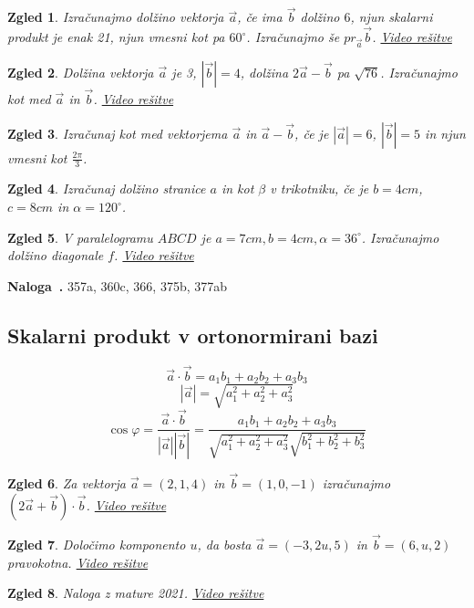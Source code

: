 \documentclass{article}
\newcounter{example}[section]
\newenvironment{example}[1][]{\refstepcounter{example}\par\medskip
   \noindent \textbf{Naloga~\theexample. #1} \rmfamily}{\medskip}
\newtheorem*{zgled}{Zgled}
\begin{document}
\begin{zgled}
    Izračunajmo dolžino vektorja $\vec{a}$, če ima $\vec{b}$ dolžino $6$, njun skalarni produkt je enak 21, njun vmesni kot pa $60^\circ$. Izračunajmo še $pr_{\vec{a}}\vec{b}$.
    \href{https://youtu.be/PCUppodHkyY}{Video rešitve}
\end{zgled}

\begin{zgled}
    Dolžina vektorja $\vec{a}$ je 3, $|\vec{b}|=4$, dolžina $2\vec{a}-\vec{b}$ pa $\sqrt{76}$. Izračunajmo kot med $\vec{a}$ in $\vec{b}$.
    \href{https://youtu.be/xMxlB981-ek}{Video rešitve}
\end{zgled}

\begin{zgled}
    Izračunaj kot med vektorjema $\vec{a}$ in $\vec{a}-\vec{b}$, če je $|\vec{a}|=6$, $|\vec{b}|=5$ in njun vmesni kot $\frac{2\pi}{3}$.
\end{zgled}

\begin{zgled}
    Izračunaj dolžino stranice $a$ in kot $\beta$ v trikotniku, če je $b=4cm$, $c=8cm$ in $\alpha =120^\circ$.
\end{zgled}

\begin{zgled}
    V paralelogramu $ABCD$ je $a=7cm, b=4cm, \alpha=36^\circ$. Izračunajmo dolžino diagonale $f$.
    \href{https://youtu.be/cA2GKU8gsrw}{Video rešitve}
\end{zgled}

\begin{example}
    357a, 360c, 366, 375b, 377ab
\end{example}

\subsection{Skalarni produkt v ortonormirani bazi}

\[\vec{a}\cdot\vec{b}=a_1b_1+a_2b_2+a_3b_3\]
\[|\vec{a}|=\sqrt{a_1^2+a_2^2+a_3^2}\]
\[\cos\varphi=\frac{\vec{a}\cdot\vec{b}}{|\vec{a}||\vec{b}|}=\frac{a_1b_1+a_2b_2+a_3b_3}{\sqrt{a_1^2+a_2^2+a_3^2}\sqrt{b_1^2+b_2^2+b_3^2}}\]

\begin{zgled}
    Za vektorja $\vec{a}=(2,1,4)$ in $\vec{b}=(1,0,-1)$ izračunajmo $(2\vec{a}+\vec{b})\cdot\vec{b}$.
    \href{https://youtu.be/6Y_1Dqk4n-A}{Video rešitve}
\end{zgled}
\begin{zgled}
    Določimo komponento $u$, da bosta $\vec{a}=(-3,2u,5)$ in $\vec{b}=(6,u,2)$ pravokotna.
    \href{https://youtu.be/5CaojlnF_iI}{Video rešitve}
\end{zgled}
\begin{zgled}
    Naloga z mature 2021. \href{https://youtu.be/Qari4okAS7w}{Video rešitve}
\end{zgled}
\end{document}
